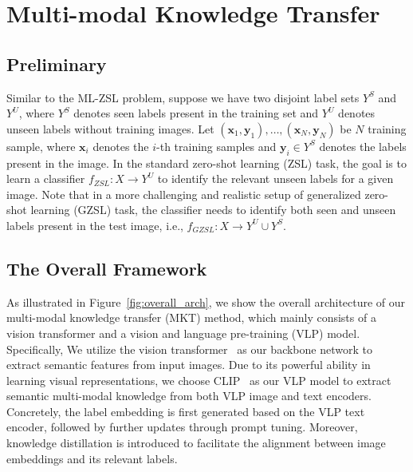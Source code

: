 \documentclass[letterpaper]{article} %
\begin{document}
\section{Multi-modal Knowledge Transfer}

\subsection{Preliminary}
Similar to the ML-ZSL problem, suppose we have two disjoint label sets $Y^{S}$ and $Y^{U}$, where $Y^{S}$ denotes seen labels present in the training set and $Y^{U}$ denotes unseen labels without training images. 
Let $\left(\mathbf{x}_{1}, \mathbf{y}_{1}\right), \ldots,\left(\mathbf{x}_{N}, \mathbf{y}_{N}\right)$ be $N$ training sample, where $\mathbf{x}_{i}$ denotes the $i$-th training samples and $\mathbf{y}_{i} \in Y^{S}$ denotes the labels present in the image.
In the standard zero-shot learning (ZSL) task, the goal is to learn a classifier $f_{Z S L}: X \rightarrow Y^{U}$ to identify the relevant unseen labels for a given image. 
Note that in a more challenging and realistic setup of generalized zero-shot learning (GZSL) task, the classifier needs to identify both seen and unseen labels present in the test image, i.e., $f_{G Z S L}: X \rightarrow Y^{U} \cup Y^{S}$. \par

\subsection{The Overall Framework}
As illustrated in Figure~\ref{fig:overall_arch}, we show the overall architecture of our multi-modal knowledge transfer (MKT) method, which mainly consists of a vision transformer and a vision and language pre-training (VLP) model. 
Specifically,
We utilize the vision transformer~\cite{vit} as our  backbone network to extract semantic features from input images.
Due to its powerful ability in learning visual representations,
we choose CLIP~\cite{clip} as our VLP model to extract semantic multi-modal knowledge from both VLP image and text encoders.
Concretely, the label embedding is first generated based on the VLP text encoder, followed by further updates through prompt tuning.
Moreover, knowledge distillation is introduced to facilitate the alignment between image embeddings and its relevant labels.
\end{document}
